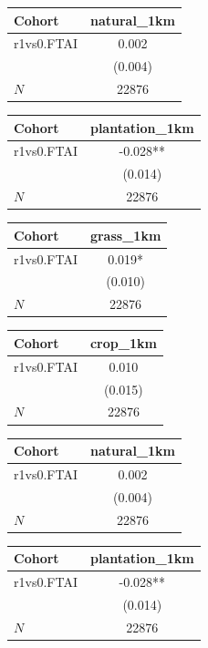 {
\def\sym#1{\ifmmode^{#1}\else\(^{#1}\)\fi}
\begin{tabular}{l*{1}{c}}
\toprule
Cohort    &natural\_1km   \\
\midrule
r1vs0.FTAI&    0.002   \\
          &  (0.004)   \\
\midrule
\(N\)     &    22876   \\
\bottomrule
\end{tabular}
}
{
\def\sym#1{\ifmmode^{#1}\else\(^{#1}\)\fi}
\begin{tabular}{l*{1}{c}}
\toprule
Cohort    &plantation\_1km   \\
\midrule
r1vs0.FTAI&   -0.028** \\
          &  (0.014)   \\
\midrule
\(N\)     &    22876   \\
\bottomrule
\end{tabular}
}
{
\def\sym#1{\ifmmode^{#1}\else\(^{#1}\)\fi}
\begin{tabular}{l*{1}{c}}
\toprule
Cohort    &grass\_1km   \\
\midrule
r1vs0.FTAI&    0.019*  \\
          &  (0.010)   \\
\midrule
\(N\)     &    22876   \\
\bottomrule
\end{tabular}
}
{
\def\sym#1{\ifmmode^{#1}\else\(^{#1}\)\fi}
\begin{tabular}{l*{1}{c}}
\toprule
Cohort    & crop\_1km   \\
\midrule
r1vs0.FTAI&    0.010   \\
          &  (0.015)   \\
\midrule
\(N\)     &    22876   \\
\bottomrule
\end{tabular}
}
{
\def\sym#1{\ifmmode^{#1}\else\(^{#1}\)\fi}
\begin{tabular}{l*{1}{c}}
\toprule
Cohort    &natural\_1km   \\
\midrule
r1vs0.FTAI&    0.002   \\
          &  (0.004)   \\
\midrule
\(N\)     &    22876   \\
\bottomrule
\end{tabular}
}
{
\def\sym#1{\ifmmode^{#1}\else\(^{#1}\)\fi}
\begin{tabular}{l*{1}{c}}
\toprule
Cohort    &plantation\_1km   \\
\midrule
r1vs0.FTAI&   -0.028** \\
          &  (0.014)   \\
\midrule
\(N\)     &    22876   \\
\bottomrule
\end{tabular}
}
